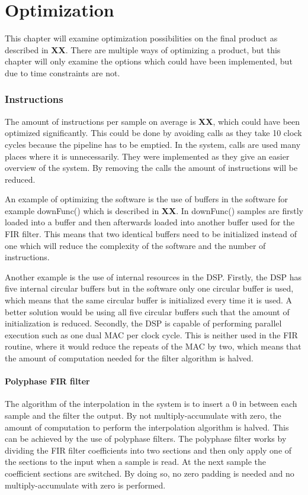 \chapter{Optimization}
This chapter will examine optimization possibilities on the final product as described in \textbf{XX}. There are multiple ways of optimizing a product, but this chapter will only examine the options which could have been implemented, but due to time constraints are not. 

\subsection*{Instructions}
The amount of instructions per sample on average is \textbf{XX}, which could have been optimized significantly. This could be done by avoiding calls as they take 10 clock cycles  because the pipeline has to be emptied. In the system, calls are used many places where it is unnecessarily. They were implemented as they give an easier overview of the system. By removing the calls the amount of instructions will be reduced. 

An example of optimizing the software is the use of buffers in the software for example downFunc() which is described in \textbf{XX}. In downFunc() samples are firstly loaded into a buffer and then afterwards loaded into another buffer used for the FIR filter. This means that two identical buffers need to be initialized instead of one which will reduce the complexity of the software and the number of instructions. 

Another example is the use of internal resources in the DSP. Firstly, the DSP has five internal circular buffers but in the software only one circular buffer is used, which means that the same circular buffer is initialized every time it is used. A better solution would be using all five circular buffers such that the amount of initialization is reduced. Secondly, the DSP is capable of performing parallel execution such as one dual MAC per clock cycle. This is neither used in the FIR routine, where it would reduce the repeats of the MAC by two, which means that the amount of computation needed for the filter algorithm is halved.  

\subsubsection*{Polyphase FIR filter}
The algorithm of the interpolation in the system is to insert a 0 in between each sample and the filter the output. By not multiply-accumulate with zero, the amount of computation to perform the interpolation algorithm is halved. This can be achieved by the use of polyphase filters. The polyphase filter works by dividing the FIR filter coefficients into two sections and then only apply one of the sections to the input when a sample is read. At the next sample the coefficient sections are switched. By doing so, no zero padding is needed and no multiply-accumulate with zero is performed.

